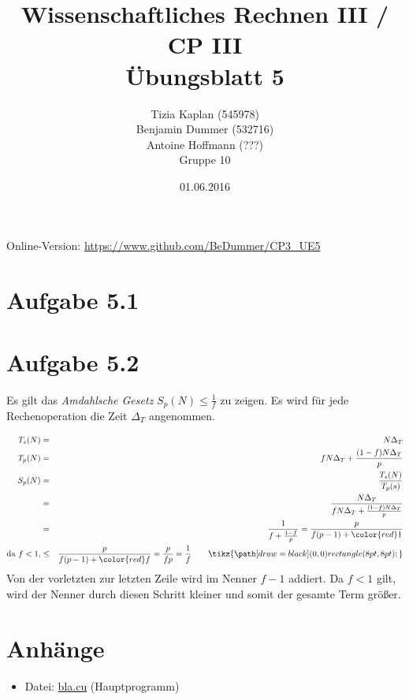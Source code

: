 \documentclass[%
	paper=A4,	%
	pagesize,	%
	DIV=calc,	%
	smallheadings,	%
	ngerman		%
]{scrartcl}
\title{{\bf Wissenschaftliches Rechnen III / CP III}\\Übungsblatt 5}
\author{Tizia Kaplan (545978)\\Benjamin Dummer (532716)\\Antoine Hoffmann (???)\\Gruppe 10}
\date{01.06.2016}
\newcommand{\mycbox}[1]{\tikz{\path[draw=#1] (0,0) rectangle (8pt,8pt);}}
\begin{document}
\maketitle
Online-Version: \href{https://www.github.com/BeDummer/CP3_UE5}{\url{https://www.github.com/BeDummer/CP3_UE5}}

\section*{Aufgabe 5.1}

\section*{Aufgabe 5.2}
Es gilt das \emph{Amdahlsche Gesetz} $S_p(N) \leq \frac{1}{f} $ zu zeigen. Es wird für jede Rechenoperation die Zeit $\Delta_T$ angenommen.

\begin{eqnarray}
	T_s (N) & = & N \Delta_T \\
	T_p (N) & = & f N \Delta_T + \dfrac{(1-f)N \Delta_T}{p} \\
	S_p (N) & = & \dfrac{T_s(N)}{T_p(s)} \\
		& = & \dfrac{N \Delta_T}{f N \Delta_T + \frac{(1-f) N \Delta_T}{p}} \nonumber \\
		& = & \dfrac{1}{f+\frac{1-f}{p}} = \dfrac{p}{f (p-1) +\color{red} 1} \nonumber \\
	\mbox{da } f < 1, & \leq & \dfrac{p}{f (p-1) +\color{red} f} = \dfrac{p}{f p} = \dfrac{1}{f} \quad \quad \mycbox{black} \nonumber
\end{eqnarray}
Von der vorletzten zur letzten Zeile wird im Nenner $f-1$ addiert. Da $f<1$ gilt, wird der Nenner durch diesen Schritt kleiner und somit der gesamte Term größer.

\section*{Anhänge}
\begin{itemize}
	\item Datei: \url{bla.cu} (Hauptprogramm)
\end{itemize}
\end{document}
